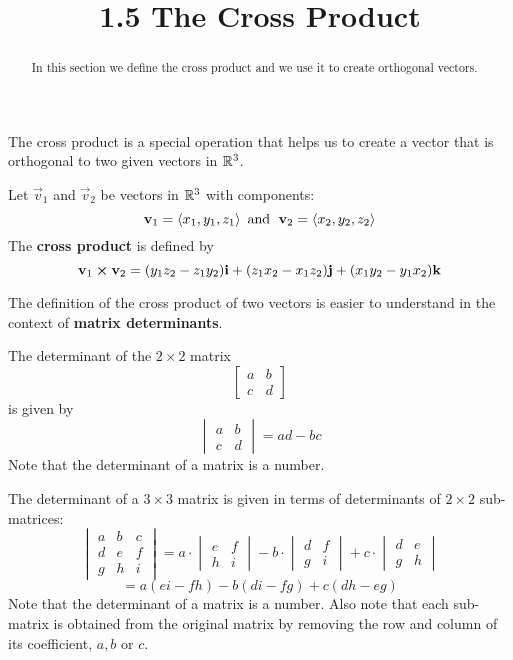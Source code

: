 \documentclass[handout]{ximera}
\title{1.5 The Cross Product}
\begin{document}
\begin{abstract}
In this section we define the cross product and we use it to create orthogonal vectors.
\end{abstract}
 
\maketitle
The cross product is a special operation that helps us to create a vector that is orthogonal to two given vectors in $\mathbb R^3$.
\begin{definition}
Let $\vec{v}_1$ and $\vec{v}_2$ be vectors in $\mathbb R^3$ with components:
\[
\mathbf{v}_1 = \left\langle x_1, y_1, z_1\right\rangle \text{  and   } \;\mathbf{v}_2 = \left\langle x_2, y_2, z_2\right\rangle
\]
The \textbf{cross product} is defined by
\[
\mathbf{v}_1 \boldsymbol\times \mathbf{v}_2 =  (y_1z_2 - z_1y_2) \mathbf{i} + (z_1x_2 - x_1z_2) \mathbf{j} + (x_1y_2 - y_1x_2) \mathbf{k} 
\]
\end{definition}

The definition of the cross product of two vectors is easier to understand in the context of \textbf{matrix determinants}.

\begin{definition}
The determinant of the $2 \times 2$ matrix 
\[
\begin{bmatrix}
a & b\\
c & d
\end{bmatrix}
\]
is  given by
\[
\begin{vmatrix}
a & b\\
c & d
\end{vmatrix}
= ad-bc
\]
Note that the determinant of a matrix is a number.
\end{definition}

\begin{definition}
The determinant of a $3 \times 3$ matrix is given in terms of determinants of $2 \times 2$ sub-matrices:
\[
\begin{vmatrix}
a & b & c\\
d & e & f\\
g & h & i
\end{vmatrix}
= a \cdot
\begin{vmatrix}
 e & f\\
 h & i
\end{vmatrix}
-b\cdot
\begin{vmatrix}

d  & f\\
g  & i
\end{vmatrix}
+c \cdot
\begin{vmatrix}
d & e \\
g & h 
\end{vmatrix}
\]
\[
= a(ei-fh) - b(di-fg) + c(dh-eg)
\]
Note that the determinant of a matrix is a number. 
Also note that each sub-matrix is obtained from the original matrix by removing the row and column of its coefficient, $a, b$ or $c$. 
\end{definition}
\end{document}
